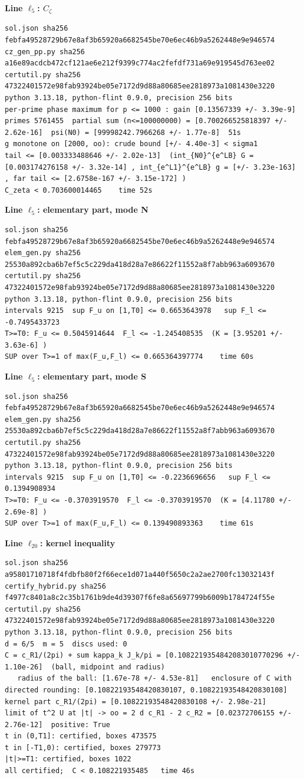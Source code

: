 \documentclass[11pt,reqno]{amsart}
\numberwithin{equation}{section}
\theoremstyle{definition}
\theoremstyle{remark}
\newcommand{\appsub}[1]{\par\medskip\noindent\textbf{#1}\par\nobreak\smallskip}
\begin{document}
\appsub{Line $\ell_{5}$: $C_\zeta$}
\begin{lstlisting}
sol.json sha256 febfa49528729b67e8af3b65920a6682545be70e6ec46b9a5262448e9e946574
cz_gen_pp.py sha256 a16e89acdcb472cf121ae6e212f9399c774ac2fefdf731a69e919545d763ee02
certutil.py sha256 47322401572e98fab93924be05e7172d9d88a80685ee2818973a1081430e3220
python 3.13.18, python-flint 0.9.0, precision 256 bits
per-prime phase maximum for p <= 1000 : gain [0.13567339 +/- 3.39e-9]
primes 5761455  partial sum (n<=100000000) = [0.700266525818397 +/- 2.62e-16]  psi(N0) = [99998242.7966268 +/- 1.77e-8]  51s
g monotone on [2000, oo): crude bound [+/- 4.40e-3] < sigma1
tail <= [0.003333488646 +/- 2.02e-13]  (int_{N0}^{e^LB} G = [0.003174276158 +/- 3.32e-14] , int_{e^L1}^{e^LB} g = [+/- 3.23e-163] , far tail <= [2.6758e-167 +/- 3.15e-172] )
C_zeta < 0.703600014465    time 52s
\end{lstlisting}
\appsub{Line $\ell_{5}$: elementary part, mode N}
\begin{lstlisting}
sol.json sha256 febfa49528729b67e8af3b65920a6682545be70e6ec46b9a5262448e9e946574
elem_gen.py sha256 25530a892cba6b7ef5c5c229da418d28a7e86622f11552a8f7abb963a6093670
certutil.py sha256 47322401572e98fab93924be05e7172d9d88a80685ee2818973a1081430e3220
python 3.13.18, python-flint 0.9.0, precision 256 bits
intervals 9215  sup F_u on [1,T0] <= 0.6653643978   sup F_l <= -0.7495433723
T>=T0: F_u <= 0.5045914644  F_l <= -1.245408535  (K = [3.95201 +/- 3.63e-6] )
SUP over T>=1 of max(F_u,F_l) <= 0.665364397774    time 60s
\end{lstlisting}
\appsub{Line $\ell_{5}$: elementary part, mode S}
\begin{lstlisting}
sol.json sha256 febfa49528729b67e8af3b65920a6682545be70e6ec46b9a5262448e9e946574
elem_gen.py sha256 25530a892cba6b7ef5c5c229da418d28a7e86622f11552a8f7abb963a6093670
certutil.py sha256 47322401572e98fab93924be05e7172d9d88a80685ee2818973a1081430e3220
python 3.13.18, python-flint 0.9.0, precision 256 bits
intervals 9215  sup F_u on [1,T0] <= -0.2236696656   sup F_l <= 0.1394908934
T>=T0: F_u <= -0.3703919570  F_l <= -0.3703919570  (K = [4.11780 +/- 2.69e-8] )
SUP over T>=1 of max(F_u,F_l) <= 0.139490893363    time 61s
\end{lstlisting}
\appsub{Line $\ell_{20}$: kernel inequality}
\begin{lstlisting}
sol.json sha256 a95801710718f4fdbfb80f2f66ece1d071a440f5650c2a2ae2700fc13032143f
certify_hybrid.py sha256 f4977c8401a8c2c35b1761b9de4d39307f6fe8a65697799b6009b1784724f55e
certutil.py sha256 47322401572e98fab93924be05e7172d9d88a80685ee2818973a1081430e3220
python 3.13.18, python-flint 0.9.0, precision 256 bits
d = 6/5  m = 5  discs used: 0 
C = c_R1/(2pi) + sum kappa_k J_k/pi = [0.1082219354842083010770296 +/- 1.10e-26]  (ball, midpoint and radius)
   radius of the ball: [1.67e-78 +/- 4.53e-81]   enclosure of C with directed rounding: [0.10822193548420830107, 0.10822193548420830108]
kernel part c_R1/(2pi) = [0.10822193548420830108 +/- 2.98e-21]
limit of t^2 U at |t| -> oo = 2 d c_R1 - 2 c_R2 = [0.02372706155 +/- 2.76e-12]  positive: True
t in (0,T1]: certified, boxes 473575
t in [-T1,0): certified, boxes 279773
|t|>=T1: certified, boxes 1022
all certified;  C < 0.108221935485   time 46s
\end{lstlisting}
\end{document}
